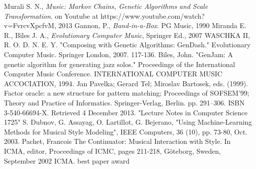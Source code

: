 \begin{thebibliography}{50}
   Murali S. N., \textsl{Music: Markov Chains, Genetic Algorithms and Scale Transformation}.
		on Youtube at https://www.youtube.com/watch?v=FvrcvXpcfvM, 2013
   Gannon, P., \textsl{Band-in-a-Box}. PG Music, 1990
   Miranda E. R., Biles J. A., \textsl{Evolutionary Computer Music}, Springer Ed., 2007
   WASCHKA II, R. O. D. N. E. Y. "Composing with Genetic Algorithms: GenDash." Evolutionary Computer Music. Springer London, 2007. 117-136.
   Biles, John. "GenJam: A genetic algorithm for generating jazz solos." Proceedings of the International Computer Music Conference. INTERNATIONAL COMPUTER MUSIC ACCOCIATION, 1994.
    Jan Pavelka; Gerard Tel; Miroslav Bartosek, eds. (1999). Factor oracle: a new structure for pattern matching; Proceedings of SOFSEM’99; Theory and Practice of Informatics. Springer-Verlag, Berlin. pp. 291–306. ISBN 3-540-66694-X. Retrieved 4 December 2013. "Lecture Notes in Computer Science 1725"
   S. Dubnov, G. Assayag, O. Lartillot, G. Bejerano, "Using Machine-Learning Methods for Musical Style Modeling", IEEE Computers, 36 (10), pp. 73-80, Oct. 2003.
   Pachet, Francois The Continuator: Musical Interaction with Style. In ICMA, editor, Proceedings of ICMC, pages 211-218, Göteborg, Sweden, September 2002 ICMA. best paper award 
  \end{thebibliography}
